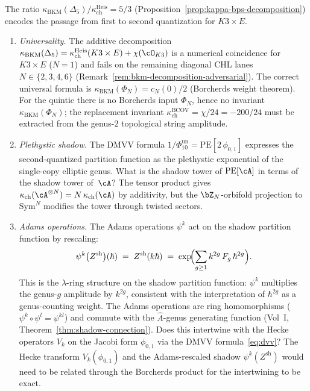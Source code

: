 \begin{openproblem}
\label{op:programme-c-second-quantization}
The ratio
$\kappa_{\mathrm{BKM}}(\Delta_5)/\kappa_{\mathrm{ch}}^{\mathrm{Heis}} = 5/3$
(Proposition~\ref{prop:kappa-bps-decomposition}) encodes the
passage from first to second quantization for $K3 \times E$.
\begin{enumerate}[label=\textup{(\roman*)}]
\item \emph{Universality.} The additive decomposition
 $\kappa_{\mathrm{BKM}}(\Delta_5)
 = \kappa_{\mathrm{ch}}^{\mathrm{Heis}}(K3\times E) + \chi(\cO_{K3})$
 is a numerical coincidence for $K3 \times E$ ($N = 1$)
 and fails on the remaining diagonal CHL lanes
 $N \in \{2,3,4,6\}$
 \textup{(}Remark~\textup{\ref{rem:bkm-decomposition-adversarial}}\textup{)}.
 The correct universal formula is
 $\kappa_{\mathrm{BKM}}(\Phi_N) = c_N(0)/2$
 \textup{(}Borcherds weight theorem\textup{)}.
 For the quintic there is no Borcherds input \(\Phi_N\), hence no
 invariant \(\kappa_{\mathrm{BKM}}(\Phi_N)\); the replacement invariant
 $\kappa_{\mathrm{ch}}^{\mathrm{BCOV}}=\chi/24=-200/24$ must be extracted from
 the genus-$2$ topological string amplitude.
\item \emph{Plethystic shadow.} The DMVV formula
 \(1/\Phi_{10}^{\mathrm{un}} = \mathrm{PE}[2\,\phi_{0,1}]\) expresses
 the second-quantized partition function as the plethystic
 exponential of the single-copy elliptic genus. What is
 the shadow tower of $\mathrm{PE}[\cA]$ in terms of
 the shadow tower of~$\cA$? The tensor product gives
 $\kappa_{\mathrm{ch}}(\cA^{\otimes N}) = N\,\kappa_{\mathrm{ch}}(\cA)$ by additivity,
 but the $\bZ_N$-orbifold projection to $\mathrm{Sym}^N$
 modifies the tower through twisted sectors.
\item \emph{Adams operations.} The Adams operations
 $\psi^k$ act on the shadow partition function by
 rescaling:
 \begin{equation}\label{eq:adams-shadow}
 \psi^k\bigl(Z^{\mathrm{sh}}\bigr)(\hbar)
 \;=\; Z^{\mathrm{sh}}(k\hbar)
 \;=\; \exp\!\Bigl(\sum_{g \geq 1}
 k^{2g}\,F_g\,\hbar^{2g}\Bigr).
 \end{equation}
 This is the $\lambda$-ring structure on the shadow
 partition function: $\psi^k$ multiplies the genus-$g$
 amplitude by $k^{2g}$, consistent with the
 interpretation of $\hbar^{2g}$ as a genus-counting
 weight. The Adams operations are ring homomorphisms
 ($\psi^k \circ \psi^l = \psi^{kl}$) and commute
 with the $\hat{A}$-genus generating function
 (Vol~I, Theorem~\ref{thm:shadow-connection}).
 Does this intertwine with the Hecke operators $V_k$
 on the Jacobi form $\phi_{0,1}$ via the DMVV
 formula~\eqref{eq:dvv}? The Hecke transform
 $V_k(\phi_{0,1})$ and the Adams-rescaled shadow
 $\psi^k(Z^{\mathrm{sh}})$ would need to be related
 through the Borcherds product for the intertwining
 to be exact.
\end{enumerate}
\end{openproblem}

